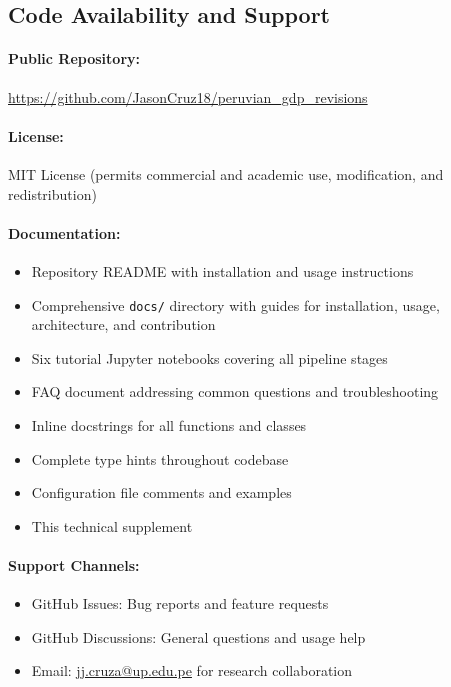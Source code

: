 \documentclass[a4paper, fleqn, 11pt]{article}
\newcommand{\filepath}[1]{\texttt{#1}}
\begin{document}
\subsection{Code Availability and Support}

\paragraph{Public Repository:} \url{https://github.com/JasonCruz18/peruvian_gdp_revisions}

\paragraph{License:} MIT License (permits commercial and academic use, modification, and redistribution)

\paragraph{Documentation:}
\begin{itemize}
    \item Repository README with installation and usage instructions
    \item Comprehensive \filepath{docs/} directory with guides for installation, usage, architecture, and contribution
    \item Six tutorial Jupyter notebooks covering all pipeline stages
    \item FAQ document addressing common questions and troubleshooting
    \item Inline docstrings for all functions and classes
    \item Complete type hints throughout codebase
    \item Configuration file comments and examples
    \item This technical supplement
\end{itemize}

\paragraph{Support Channels:}
\begin{itemize}
    \item GitHub Issues: Bug reports and feature requests
    \item GitHub Discussions: General questions and usage help
    \item Email: \href{mailto:jj.cruza@up.edu.pe}{jj.cruza@up.edu.pe} for research collaboration
\end{itemize}
\end{document}
